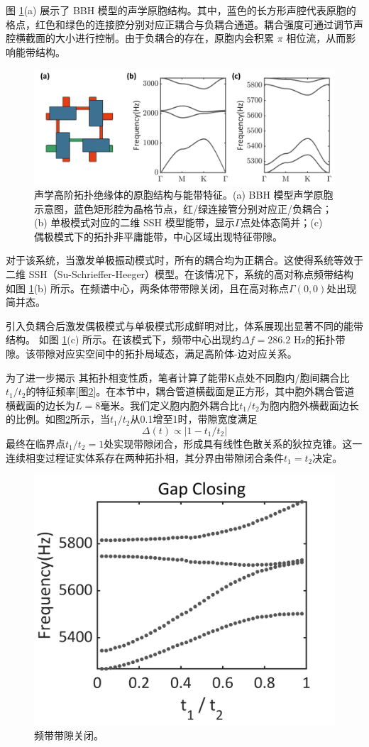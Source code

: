 图 \ref{fig:EnergyBand}(a) 展示了 BBH 模型的声学原胞结构。其中，蓝色的长方形声腔代表原胞的格点，红色和绿色的连接腔分别对应正耦合与负耦合通道。耦合强度可通过调节声腔横截面的大小进行控制。由于负耦合的存在，原胞内会积累 $\pi$ 相位流，从而影响能带结构。

\begin{figure}[htbp]
    \centering
    \includegraphics[width=0.85\linewidth]{figure/HOTIExp/EnergyBand.png}
    \caption{声学高阶拓扑绝缘体的原胞结构与能带特征。(a) BBH 模型声学原胞示意图，蓝色矩形腔为晶格节点，红/绿连接管分别对应正/负耦合；(b) 单极模式对应的二维 SSH 模型能带，显示$\Gamma$点处体态简并；(c) 偶极模式下的拓扑非平庸能带，中心区域出现特征带隙。}
    \label{fig:EnergyBand}
\end{figure}

对于该系统，当激发单极振动模式时，所有的耦合均为正耦合。这使得系统等效于二维 SSH（Su-Schrieffer-Heeger）模型\cite{zheng2022observation}。在该情况下，系统的高对称点频带结构如图 \ref{fig:EnergyBand}(b) 所示。在频谱中心，两条体带带隙关闭，且在高对称点$\Gamma(0,0)$处出现简并态。

引入负耦合后激发偶极模式与单极模式形成鲜明对比，体系展现出显著不同的能带结构。 如图 \ref{fig:EnergyBand}(c) 所示。在该模式下，频带中心出现约$\Delta f = 286.2$ Hz的拓扑带隙。该带隙对应实空间中的拓扑局域态，满足高阶体-边对应关系\cite{benalcazar2017quantized}。

为了进一步揭示 其拓扑相变性质，笔者计算了能带K点处不同胞内/胞间耦合比$t_1/t_2$的特征频率[图\ref{fig:GapClosing}]。在本节中，耦合管道横截面是正方形，其中胞外耦合管道横截面的边长为$L=8$毫米。我们定义胞内胞外耦合比$t_1/t_2$为胞内胞外横截面边长的比例。如图\ref{fig:GapClosing}所示，当$t_1/t_2$从0.1增至1时，带隙宽度满足
\begin{equation}
    \Delta(t)\propto |1 - t_1/t_2|
\end{equation}
最终在临界点$t_1/t_2=1$处实现带隙闭合，形成具有线性色散关系的狄拉克锥。这一连续相变过程证实体系存在两种拓扑相，其分界由带隙闭合条件$t_1 = t_2$决定。
\begin{figure}[htbp]
    \centering
    \includegraphics[width=0.5\linewidth]{figure/HOTIExp/GapClosing.png}
    \caption{频带带隙关闭。}
    \label{fig:GapClosing}
\end{figure}

